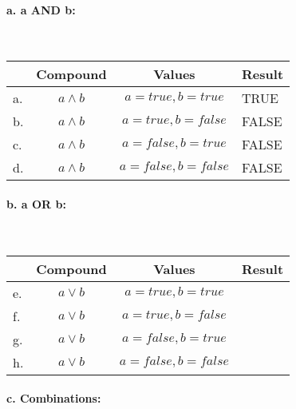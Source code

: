         \paragraph{a. a AND b:} ~\\

        \begin{tabular}{ | l  c | c | p{6cm} | }
            \hline
            & \textbf{Compound} & \textbf{Values} & \textbf{Result}
            \\ \hline

            a. &        $a \land b$ &       $a = true, b = true$ &       TRUE   \\ \hline
            b. &        $a \land b$ &       $a = true, b = false$ &       FALSE   \\ \hline
            c. &        $a \land b$ &       $a = false, b = true$ &       FALSE   \\ \hline
            d. &        $a \land b$ &       $a = false, b = false$ &       FALSE   \\ \hline
        \end{tabular}

        \paragraph{b. a OR b:} ~\\

        \begin{tabular}{ | l  c | c | p{6cm} | }
            \hline
            & \textbf{Compound} & \textbf{Values} & \textbf{Result}
            \\ \hline

            e. &        $a \lor b$ &       $a = true, b = true$ &     \\ \hline
            f. &        $a \lor b$ &       $a = true, b = false$ &    \\ \hline
            g. &        $a \lor b$ &       $a = false, b = true$ &    \\ \hline
            h. &        $a \lor b$ &       $a = false, b = false$ &   \\ \hline
        \end{tabular}

        \paragraph{c. Combinations:} ~\\

